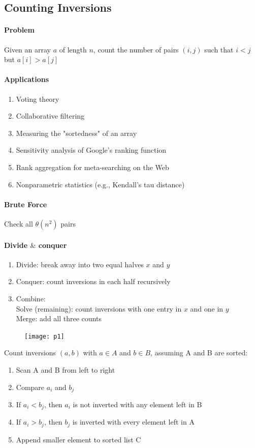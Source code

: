 \documentclass[11pt]{article}
\begin{document}
\subsection{Counting Inversions}
\paragraph{Problem}
Given an array $a$ of length $n$, count the number of pairs $(i,j)$ such that $i < j$ but $a[i] > a[j]$
\paragraph{Applications}
\begin{enumerate}
	\item Voting theory
	\item Collaborative filtering
	\item Measuring the "sortedness" of an array
	\item Sensitivity analysis of Google's ranking function
	\item Rank aggregation for meta-searching on the Web
	\item Nonparametric statistics (e.g., Kendall's tau distance)
\end{enumerate}

\paragraph{Brute Force}
Check all $\theta(n^2)$ pairs

\paragraph{Divide $\&$ conquer}
\begin{enumerate} 
	\item Divide: break away into two equal halves $x$ and $y$
	\item Conquer: count inversions in each half recursively
	\item Combine: \\
	Solve (remaining): count inversions with one entry in $x$ and one in $y$ \\
	Merge: add all three counts
\end{enumerate}

\begin{figure}[h]
	\centering
	\texttt{[image: p1]}
\end{figure}

Count inversions $(a,b)$ with $a \in A$ and $b \in B$, assuming A and B are sorted:
\begin{enumerate}
	\item Scan A and B from left to right
	\item Compare $a_i$ and $b_j$
	\item If $a_i < b_j$, then $a_i$ is not inverted with any element left in B
	\item If $a_i > b_j$, then $b_j$ is inverted with every element left in A
	\item Append smaller element to sorted list C
\end{enumerate}
\end{document}
